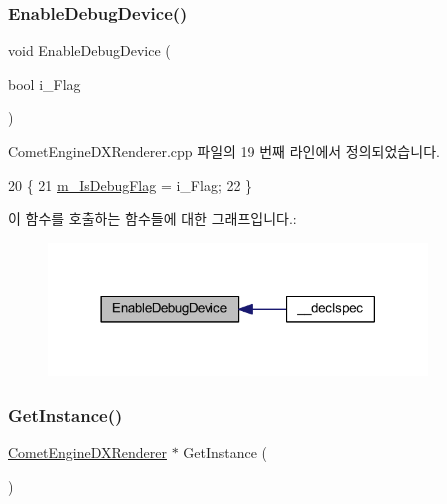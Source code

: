 \subsubsection{\texorpdfstring{Enable\+Debug\+Device()}{EnableDebugDevice()}}
{\footnotesize\ttfamily void Enable\+Debug\+Device (\begin{DoxyParamCaption}\item[{bool}]{i\+\_\+\+Flag }\end{DoxyParamCaption})}



Comet\+Engine\+D\+X\+Renderer.\+cpp 파일의 19 번째 라인에서 정의되었습니다.


\begin{DoxyCode}
20 \{
21     \hyperlink{class_comet_engine_1_1_renderer_1_1_comet_engine_d_x_renderer_a4605315a46596f062351adb5071a334c}{m\_IsDebugFlag} = i\_Flag;
22 \}
\end{DoxyCode}
이 함수를 호출하는 함수들에 대한 그래프입니다.\+:\nopagebreak
\begin{figure}[H]
\begin{center}
\leavevmode
\includegraphics[width=285pt]{class_comet_engine_1_1_renderer_1_1_comet_engine_d_x_renderer_a0cec813dd654a43d162981c37b0cbf6e_icgraph}
\end{center}
\end{figure}
\mbox{\label{class_comet_engine_1_1_renderer_1_1_comet_engine_d_x_renderer_a9894517531990b824a58e1f61c6d542e}} 
\subsubsection{\texorpdfstring{Get\+Instance()}{GetInstance()}}
{\footnotesize\ttfamily \hyperlink{class_comet_engine_1_1_renderer_1_1_comet_engine_d_x_renderer}{Comet\+Engine\+D\+X\+Renderer} $\ast$ Get\+Instance (\begin{DoxyParamCaption}{ }\end{DoxyParamCaption})\hspace{0.3cm}{\ttfamily [static]}}



